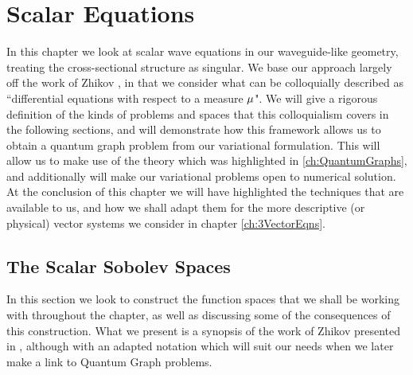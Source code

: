 \chapter{Scalar Equations} \label{ch:ScalarEqns}
In this chapter we look at scalar wave equations in our waveguide-like geometry, treating the cross-sectional structure as singular.
We base our approach largely off the work of Zhikov \cite{zhikov2000extension}, in that we consider what can be colloquially described as ``differential equations with respect to a measure $\mu$".
We will give a rigorous definition of the kinds of problems and spaces that this colloquialism covers in the following sections, and will demonstrate how this framework allows us to obtain a quantum graph problem from our variational formulation.
This will allow us to make use of the theory which was highlighted in \ref{ch:QuantumGraphs}, and additionally will make our variational problems open to numerical solution.
At the conclusion of this chapter we will have highlighted the techniques that are available to us, and how we shall adapt them for the more descriptive (or physical) vector systems we consider in chapter \ref{ch:3VectorEqns}.

\section{The Scalar Sobolev Spaces} \label{sec:ScalarSobSpaces}
In this section we look to construct the function spaces that we shall be working with throughout the chapter, as well as discussing some of the consequences of this construction.
What we present is a synopsis of the work of Zhikov presented in \cite{zhikov2000extension}, although with an adapted notation which will suit our needs when we later make a link to Quantum Graph problems. \newline

